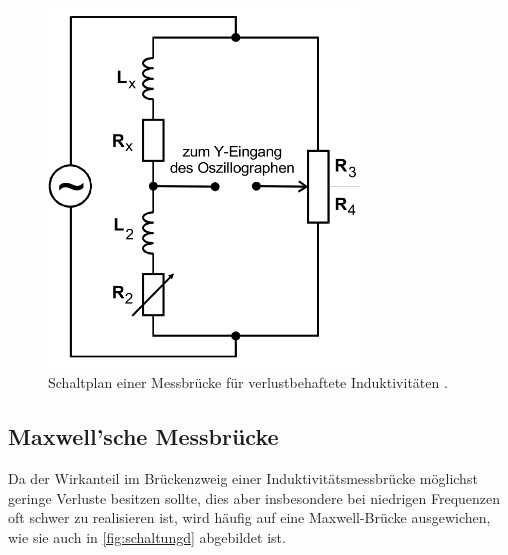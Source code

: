 \sloppy
\begin{figure}[H]
    \centering
    \includegraphics[width=0.75\textwidth]{dateien/aufgabec).png}
    \caption{Schaltplan einer Messbrücke für verlustbehaftete Induktivitäten \cite{anleitung}.}
    \label{fig:schaltungc}
\end{figure}

\subsection{Maxwell'sche Messbrücke}
Da der Wirkanteil im Brückenzweig einer Induktivitätsmessbrücke möglichst geringe Verluste besitzen sollte, dies aber
insbesondere bei niedrigen Frequenzen oft schwer zu realisieren ist, wird häufig auf eine Maxwell-Brücke ausgewichen, wie
sie auch in \autoref{fig:schaltungd} abgebildet ist.


